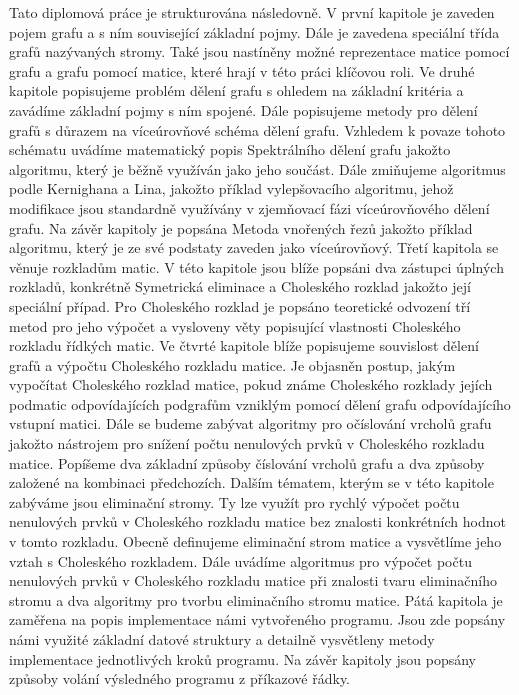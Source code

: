 \documentclass{ctuthesis}
\theoremstyle{plain}
\theoremstyle{definition}
\begin{document}
Tato diplomová práce je strukturována následovně. V první kapitole je zaveden pojem grafu a s ním související základní pojmy. Dále je zavedena speciální třída grafů nazývaných stromy. Také jsou nastíněny možné reprezentace matice pomocí grafu a grafu pomocí matice, které hrají v této práci klíčovou roli.
Ve druhé kapitole popisujeme problém dělení grafu s ohledem na základní kritéria a zavádíme základní pojmy s ním spojené. Dále popisujeme metody pro dělení grafů s důrazem na víceúrovňové schéma dělení grafu. Vzhledem k povaze tohoto schématu uvádíme matematický popis Spektrálního dělení grafu jakožto algoritmu, který je běžně využíván jako jeho součást. Dále zmiňujeme algoritmus podle Kernighana a Lina, jakožto příklad vylepšovacího algoritmu, jehož modifikace jsou standardně využívány v zjemňovací fázi víceúrovňového dělení grafu. Na závěr kapitoly je popsána Metoda vnořených řezů jakožto příklad algoritmu, který je ze své podstaty zaveden jako víceúrovňový.
Třetí kapitola se věnuje rozkladům matic. V této kapitole jsou blíže popsáni dva zástupci úplných rozkladů, konkrétně Symetrická eliminace a Choleského rozklad jakožto její speciální případ. Pro Choleského rozklad je popsáno teoretické odvození tří metod pro jeho výpočet a vysloveny věty popisující vlastnosti Choleského rozkladu řídkých matic.
Ve čtvrté kapitole blíže popisujeme souvislost dělení grafů a výpočtu Choleského rozkladu matice. Je objasněn postup, jakým vypočítat Choleského rozklad matice, pokud známe Choleského rozklady jejích podmatic odpovídajících podgrafům vzniklým pomocí dělení grafu odpovídajícího vstupní matici. Dále se budeme zabývat algoritmy pro očíslování vrcholů grafu jakožto nástrojem pro snížení počtu nenulových prvků v Choleského rozkladu matice. Popíšeme dva základní způsoby číslování vrcholů grafu a dva způsoby založené na kombinaci předchozích. Dalším tématem, kterým se v této kapitole zabýváme jsou eliminační stromy. Ty lze využít pro rychlý výpočet počtu nenulových prvků v Choleského rozkladu matice bez znalosti konkrétních hodnot v tomto rozkladu. Obecně definujeme eliminační strom matice a vysvětlíme jeho vztah s Choleského rozkladem. Dále uvádíme algoritmus pro výpočet počtu nenulových prvků v Choleského rozkladu matice při znalosti tvaru eliminačního stromu a dva algoritmy pro tvorbu eliminačního stromu matice.
Pátá kapitola je zaměřena na popis implementace námi vytvořeného programu. Jsou zde popsány námi využité základní datové struktury a detailně vysvětleny metody implementace jednotlivých kroků programu. Na závěr kapitoly jsou popsány způsoby volání výsledného programu z příkazové řádky.
\end{document}
